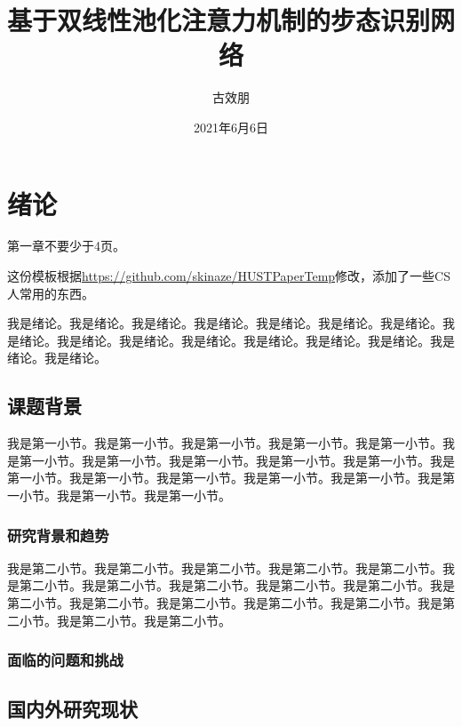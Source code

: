 \documentclass[supercite]{Experimental_Report}
\title{基于双线性池化注意力机制的步态识别网络}
\author{古效朋}
\date{2021年6月6日}
\theoremstyle{definition}
\begin{document}
\maketitle


\clearpage




\tableofcontents[level=2]
\clearpage


\section{绪论}

第一章不要少于4页。

这份模板根据\url{https://github.com/skinaze/HUSTPaperTemp}\cite{ski17}修改，添加了一些CS人常用的东西\cite{baf96}。

我是绪论。我是绪论。我是绪论。我是绪论。我是绪论。我是绪论。我是绪论。我是绪论。我是绪论。我是绪论。我是绪论。我是绪论。我是绪论。我是绪论。我是绪论。我是绪论。

\subsection{课题背景}

我是第一小节。我是第一小节。我是第一小节。我是第一小节。我是第一小节。我是第一小节。我是第一小节。我是第一小节。我是第一小节。我是第一小节。我是第一小节。我是第一小节。我是第一小节。我是第一小节。我是第一小节。我是第一小节。我是第一小节。我是第一小节。

\subsubsection{研究背景和趋势}

我是第二小节。我是第二小节。我是第二小节。我是第二小节。我是第二小节。我是第二小节。我是第二小节。我是第二小节。我是第二小节。我是第二小节。我是第二小节。我是第二小节。我是第二小节。我是第二小节。我是第二小节。我是第二小节。我是第二小节。我是第二小节。

\subsubsection{面临的问题和挑战}

\subsection{国内外研究现状}
\end{document}
